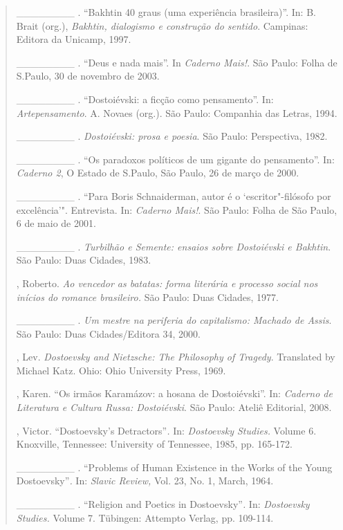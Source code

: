 {\begin{quote}
\begin{Parskip}
\_\_\_\_\_\_\_\_ . ``Bakhtin 40 graus (uma experiência brasileira)''.
In: B. Brait (org.), \emph{Bakhtin, dialogismo e construção do sentido}.
Campinas: Editora da Unicamp, 1997.

\_\_\_\_\_\_\_\_ . ``Deus e nada mais''. In \emph{Caderno Mais!}. São
Paulo: Folha de S.Paulo, 30 de novembro de 2003.

\_\_\_\_\_\_\_\_ . ``Dostoiévski: a ficção como pensamento''. In:
\emph{Artepensamento}. A. Novaes (org.). São Paulo: Companhia das
Letras, 1994.

\_\_\_\_\_\_\_\_ . \emph{Dostoiévski: prosa e poesia}. São Paulo:
Perspectiva, 1982.

\_\_\_\_\_\_\_\_ . ``Os paradoxos políticos de um gigante do
pensamento''. In: \emph{Caderno 2}, O Estado de S.Paulo, São Paulo, 26
de março de 2000.

\_\_\_\_\_\_\_\_ . ``Para Boris Schnaiderman, autor é o
`escritor"-filósofo por excelência'". Entrevista. In: \emph{Caderno
Mais!}. São Paulo: Folha de São Paulo, 6 de maio de 2001.

\_\_\_\_\_\_\_\_ . \emph{Turbilhão e Semente: ensaios sobre Dostoiévski
e Bakhtin}. São Paulo: Duas Cidades, 1983.

, Roberto. \emph{Ao vencedor as batatas: forma literária e
processo social nos inícios do romance brasileiro.} São Paulo: Duas
Cidades, 1977.

\_\_\_\_\_\_\_\_ . \emph{Um mestre na periferia do capitalismo: Machado
de Assis}. São Paulo: Duas Cidades/Editora 34, 2000.

, Lev. \emph{Dostoevsky and Nietzsche: The Philosophy of
Tragedy}. Translated by Michael Katz. Ohio: Ohio University Press, 1969.

, Karen. ``Os irmãos Karamázov: a hosana de Dostoiévski''. In:
\emph{Caderno de Literatura e Cultura Russa: Dostoiévski}. São Paulo:
Ateliê Editorial, 2008.

, Victor. ``Dostoevsky's Detractors''\emph{.} In: \emph{Dostoevsky
Studies.} Volume 6. Knoxville, Tennessee: University of Tennessee, 1985,
pp. 165-172.

\_\_\_\_\_\_\_\_ . ``Problems of Human Existence in the Works of the
Young Dostoevsky''\emph{.} In: \emph{Slavic Review,} Vol. 23, No. 1,
March, 1964.

\_\_\_\_\_\_\_\_ . ``Religion and Poetics in Dostoevsky''\emph{.} In:
\emph{Dostoevsky Studies.} Volume 7. Tübingen: Attempto Verlag, pp.
109-114.


\end{Parskip}
\end{quote}}
